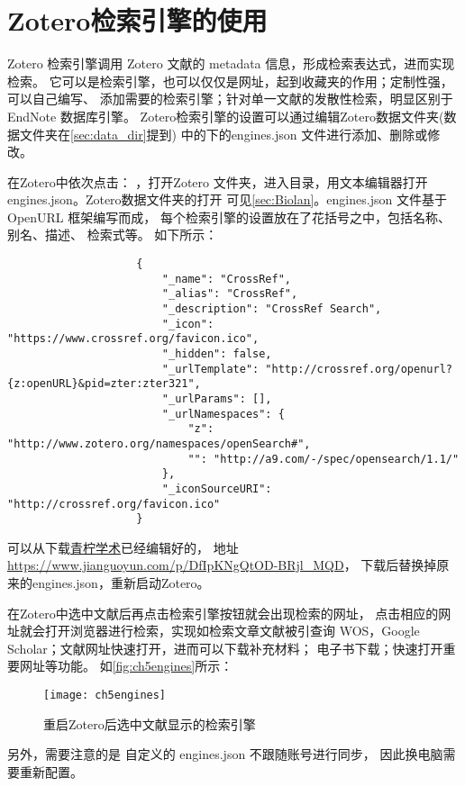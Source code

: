 \documentclass[cn,11pt,chinese]{elegantbook}
\begin{document}
		\section{Zotero检索引擎的使用}\label{sec:Engines}
			Zotero 检索引擎调用 Zotero 文献的 metadata 信息，形成检索表达式，进而实现检索。
			它可以是检索引擎，也可以仅仅是网址，起到收藏夹的作用；定制性强，可以自己编写、
			添加需要的检索引擎；针对单一文献的发散性检索，明显区别于 EndNote 数据库引擎。
			Zotero检索引擎的设置可以通过编辑Zotero数据文件夹(数据文件夹在\cref{sec:data_dir}提到)
			中的下的engines.json
			文件进行添加、删除或修改。

			在Zotero中依次点击：
			，打开Zotero 
			文件夹，进入目录，用文本编辑器打开engines.json。Zotero数据文件夹的打开
			可见\cref{sec:Biolan}。engines.json 文件基于 OpenURL 框架编写而成，
			每个检索引擎的设置放在了花括号之中，包括名称、别名、描述、
			检索式等。
			如下所示：
				\begin{lstlisting}
					{
						"_name": "CrossRef",
						"_alias": "CrossRef",
						"_description": "CrossRef Search",
						"_icon": "https://www.crossref.org/favicon.ico",
						"_hidden": false,
						"_urlTemplate": "http://crossref.org/openurl?{z:openURL}&pid=zter:zter321",
						"_urlParams": [],
						"_urlNamespaces": {
							"z": "http://www.zotero.org/namespaces/openSearch#",
							"": "http://a9.com/-/spec/opensearch/1.1/"
						},
						"_iconSourceURI": "http://crossref.org/favicon.ico"
					}

				\end{lstlisting}
			
			
				可以从下载\href{https://www.zhihu.com/people/iseex/answers
			}{青柠学术}已经编辑好的，
			地址\url{https://www.jianguoyun.com/p/DfIpKNgQtOD-BRjl_MQD}，
			下载后替换掉原来的engines.json，重新启动Zotero。

			在Zotero中选中文献后再点击检索引擎按钮就会出现检索的网址，
			点击相应的网址就会打开浏览器进行检索，实现如检索文章文献被引查询
			WOS，Google Scholar；文献网址快速打开，进而可以下载补充材料；
			电子书下载；快速打开重要网址等功能。	
			如\autoref{fig:ch5engines}所示：
				\begin{figure}[ht]
					\centering
					\texttt{[image: ch5engines]}
					\caption{重启Zotero后选中文献显示的检索引擎}
					\label{fig:ch5engines}
				\end{figure}
			另外，需要注意的是
		自定义的 engines.json 不跟随账号进行同步，
		因此换电脑需要重新配置。
\end{document}
